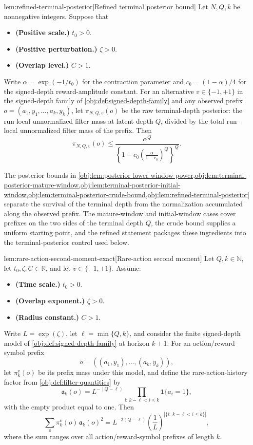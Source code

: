 \begin{lemmav}{lem:refined-terminal-posterior}[Refined terminal posterior bound]
Let \(N,Q,k\) be nonnegative integers. Suppose that
\begin{itemize}
\item \textbf{(Positive scale.)} \(t_0>0\).
\item \textbf{(Positive perturbation.)} \(\zeta>0\).
\item \textbf{(Overlap level.)} \(C>1\).
\end{itemize}
Write \(\alpha=\exp(-1/t_0)\) for the contraction parameter and
\(c_0=(1-\alpha)/4\) for the signed-depth reward-amplitude constant. For an
alternative \(v\in\{-1,+1\}\) in the signed-depth family of
\cref{obj:def:signed-depth-family} and any observed prefix
\(o=(a_1,y_1,\ldots,a_k,y_k)\), let \(\pi_{N,Q,v}(o)\) be the raw
terminal-depth posterior: the run-local unnormalized filter mass at latent
depth \(Q\), divided by the total run-local unnormalized filter mass of the
prefix. Then
\[
\pi_{N,Q,v}(o)
\le
\frac{\alpha^Q}
{\left\{1-c_0\left(\frac{\alpha}{1-c_0}\right)^Q\right\}^Q}.
\]
\end{lemmav}

The posterior bounds in \cref{obj:lem:posterior-lower-window-power,obj:lem:terminal-posterior-mature-window,obj:lem:terminal-posterior-initial-window,obj:lem:terminal-posterior-crude-bound,obj:lem:refined-terminal-posterior} separate the survival of the terminal depth from the normalization accumulated along the observed prefix. The mature-window and initial-window cases cover prefixes on the two sides of the terminal depth \(Q\), the crude bound supplies a uniform starting point, and the refined statement packages these ingredients into the terminal-posterior control used below.

\begin{lemmav}{lem:rare-action-second-moment-exact}[Rare-action second moment]
Let \(Q,k\in\mathbb N\), let \(t_0,\zeta,C\in\mathbb R\), and let \(v\in\{-1,+1\}\). Assume:
\begin{itemize}
\item \textbf{(Time scale.)} \(t_0>0\).
\item \textbf{(Overlap exponent.)} \(\zeta>0\).
\item \textbf{(Radius constant.)} \(C>1\).
\end{itemize}
Write \(L=\exp(\zeta)\), let \(\ell=\min\{Q,k\}\), and consider the finite signed-depth model of \cref{obj:def:signed-depth-family} at horizon \(k+1\). For an action/reward-symbol prefix
\[
o=((a_1,y_1),\ldots,(a_k,y_k)),
\]
let \(\pi_k^v(o)\) be its prefix mass under this model, and define the rare-action-history factor from \cref{obj:def:filter-quantities} by
\[
\mathfrak a_k(o)
=
L^{-(Q-\ell)}
\prod_{i:\,k-\ell<i\le k}\mathbf 1\{a_i=1\},
\]
with the empty product equal to one. Then
\[
\sum_{o}\pi_k^v(o)\,\mathfrak a_k(o)^2
=
L^{-2(Q-\ell)}
\left(\frac{1}{L}\right)^{|\{i:\ k-\ell<i\le k\}|},
\]
where the sum ranges over all action/reward-symbol prefixes of length \(k\).
\end{lemmav}

